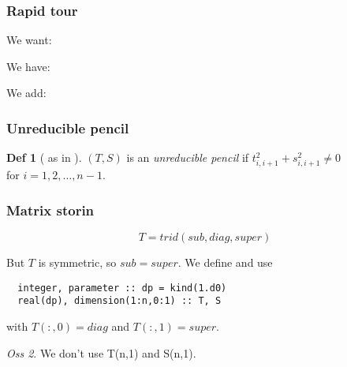\documentclass{beamer}
\theoremstyle{definition} \newtheorem{de}{Def}
\theoremstyle{remark} \newtheorem{os}[de]{Oss}
\theoremstyle{plain} \newtheorem{te}[de]{Teo}
\theoremstyle{plain} \newtheorem{co}[de]{Cor}
\theoremstyle{plain} \newtheorem{pr}[de]{Prop}
\theoremstyle{plain} \newtheorem{lem}[de]{Lemm}
\theoremstyle{remark} \newtheorem{rem}[de]{Remark}
\begin{document}
\begin{frame}
\frametitle{Rapid tour}

\begin{Bdescription}
  \item [We want:]
  
  \item [We have:]

  \item [We add:]
\end{Bdescription}
\end{frame}


\begin{frame}
\frametitle{Unreducible pencil}

\begin{de}[ as in \cite{MR739278} ]
  $(T,S)$ is an \emph{unreducible pencil} if $t_{i,i+1}^2 + 
s_{i,i+1}^2 \neq 0$\\
  for $i=1,2,\dots,n-1$.
\end{de}
\end{frame}

\begin{frame}[fragile]
\frametitle{Matrix storin}

\begin{equation*}
  T = trid(sub,diag,super)
\end{equation*}

But $T$ is symmetric, so $sub=super$. We define and use

\begin{lstlisting}
  integer, parameter :: dp = kind(1.d0)
  real(dp), dimension(1:n,0:1) :: T, S  
\end{lstlisting}

with $T(:,0)=diag$ and $T(:,1)=super$.

\begin{os}
  We don't use T(n,1) and S(n,1). 
\end{os}

\end{frame}
\end{document}
